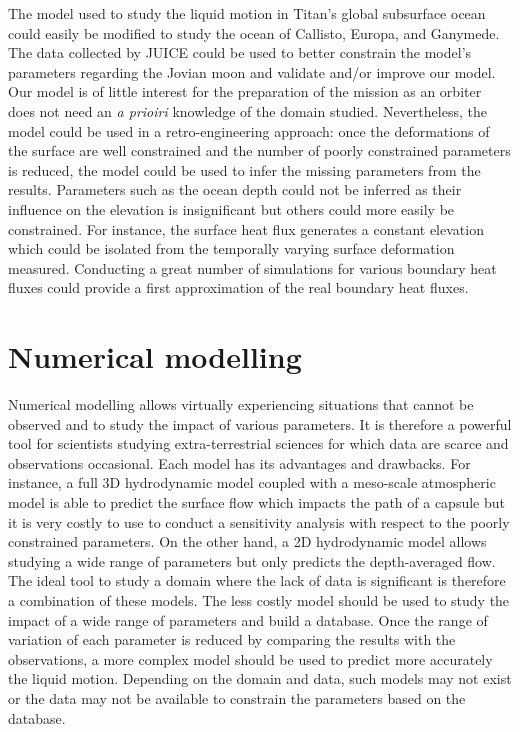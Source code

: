 The model used to study the liquid motion in Titan's global subsurface ocean could easily be modified to study the ocean of Callisto, Europa, and Ganymede. The data collected by JUICE could be used to better constrain the model's parameters regarding the Jovian moon and validate and/or improve our model. Our model is of little interest for the preparation of the mission as an orbiter does not need an \textit{a prioiri} knowledge of the domain studied. Nevertheless, the model could be used in a retro-engineering approach: once the deformations of the surface are well constrained and the number of poorly constrained parameters is reduced, the model could be used to infer the missing parameters from the results. Parameters such as the ocean depth could not be inferred as their influence on the elevation is insignificant but others could more easily be constrained. For instance, the surface heat flux generates a constant elevation which could be isolated from the temporally varying surface deformation measured. Conducting a great number of simulations for various boundary heat fluxes could provide a first approximation of the real boundary heat fluxes.

\section*{Numerical modelling}%
Numerical modelling allows virtually experiencing situations that cannot be observed and to study the impact of various parameters. It is therefore a powerful tool for scientists studying extra-terrestrial sciences for which data are scarce and observations occasional. Each model has its advantages and drawbacks. For instance, a full 3D hydrodynamic model coupled with a meso-scale atmospheric model is able to predict the surface flow which impacts the path of a capsule but it is very costly to use to conduct a sensitivity analysis with respect to the poorly constrained parameters. On the other hand, a 2D hydrodynamic model allows studying a wide range of parameters but only predicts the depth-averaged flow. The ideal tool to study a domain where the lack of data is significant is therefore a combination of these models. The less costly model should be used to study the impact of a wide range of parameters and build a database. Once the range of variation of each parameter is reduced by comparing the results with the observations, a more complex model should be used to predict more accurately the liquid motion. Depending on the domain and data, such models may not exist or the data may not be available to constrain the parameters based on the database. 

